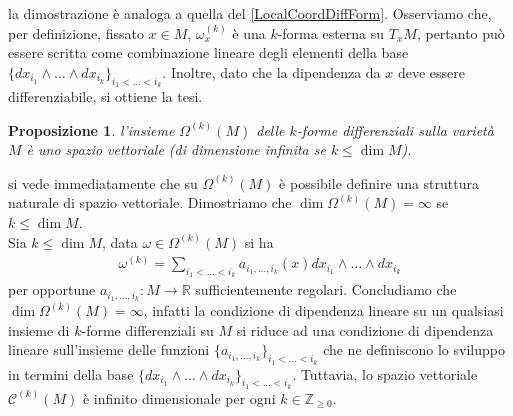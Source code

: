 \documentclass[oneside, 11pt]{amsbook}
\makeatletter
\newcommand{\0}{{(0)}}
\newcommand{\3}{{(3)}}
\theoremstyle{colonplain}
\newtheorem{prop}[thm]{Proposizione}
\theoremstyle{colondefinition}
\theoremstyle{colonremark}
\numberwithin{equation}{chapter}
\renewcommand{\proofname}{Dimostrazione}
\renewenvironment{proof}[1][\proofname]{\par
  \pushQED{\qed}%
  \normalfont \topsep6\p@\@plus6\p@\relax
  \trivlist
  \item[\hskip\labelsep\bfseries #1:]\ignorespaces
}{%
  \popQED\endtrivlist\@endpefalse
}
\makeatother
\begin{document}
\begin{proof} la dimostrazione è analoga a quella del \cref{LocalCoordDiffForm}. Osserviamo che, per definizione, fissato $x \in M$, $\omega^{(k)}_x$ è una $k$-forma esterna su $T_xM$, pertanto può essere scritta come combinazione lineare degli elementi della base $\{dx_{i_1} \wedge \dots \wedge dx_{i_k}\}_{i_1 < \dots < i_k}$. Inoltre, dato che la dipendenza da $x$ deve essere differenziabile, si ottiene la tesi.
\end{proof}
\begin{prop} l'insieme $\Omega^{(k)}(M)$ delle $k$-forme differenziali sulla varietà $M$ è uno spazio vettoriale (di dimensione infinita se $k \leq \dim M$).
\end{prop}

\begin{proof} si vede immediatamente che su $\Omega^{(k)}(M)$ è possibile definire una struttura naturale di spazio vettoriale. Dimostriamo che $\dim \Omega^{(k)}(M) = \infty$ se $k \leq \dim M$. \\
Sia $k \leq \dim M$, data $\omega \in \Omega^{(k)}(M)$ si ha 
\begin{align}
   \omega^{(k)} = \sum_{i_1 < \dots < i_k}a_{i_1, \dots, i_k}(x)dx_{i_1} \wedge \dots \wedge dx_{i_k} 
\end{align}
per opportune $a_{i_1, \dots, i_k} : M \longrightarrow \mathbb{R}$ sufficientemente regolari. Concludiamo che $\dim \Omega^{(k)}(M) = \infty$, infatti la condizione di dipendenza lineare su un qualsiasi insieme di $k$-forme differenziali su $M$ si riduce ad una condizione di dipendenza lineare sull'insieme delle funzioni $\{a_{i_1, \dots, i_k}\}_{i_1 < \dots < i_k}$ che ne definiscono lo sviluppo in termini della base $\{dx_{i_1} \wedge \dots \wedge dx_{i_k}\}_{i_1 < \dots < i_k}$. Tuttavia, lo spazio vettoriale $\mathcal{C}^{(k)}(M)$ è infinito dimensionale per ogni $k \in \mathbb{Z}_{\geq 0}$.
\end{proof}
\end{document}
